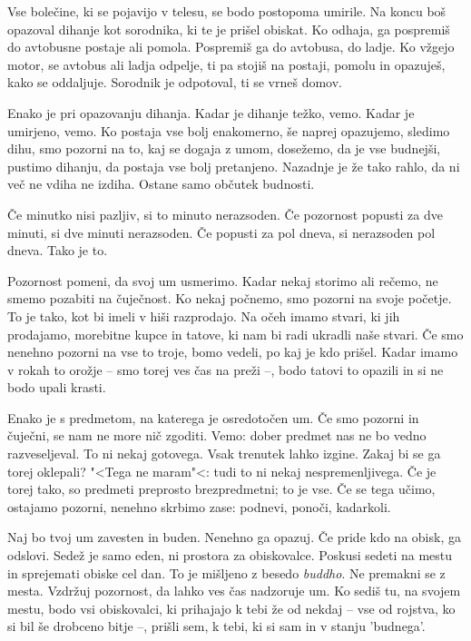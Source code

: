 Vse bolečine, ki se pojavijo v telesu, se bodo postopoma umirile. Na koncu boš opazoval dihanje kot sorodnika, ki te je prišel obiskat. Ko odhaja, ga pospremiš do avtobusne postaje ali pomola. Pospremiš ga do avtobusa, do ladje. Ko vžgejo motor, se avtobus ali ladja odpelje, ti pa stojiš na postaji, pomolu in opazuješ, kako se oddaljuje. Sorodnik je odpotoval, ti se vrneš domov.

Enako je pri opazovanju dihanja. Kadar je dihanje težko, vemo. Kadar je umirjeno, vemo. Ko postaja vse bolj enakomerno, še naprej opazujemo, sledimo dihu, smo pozorni na to, kaj se dogaja z umom, dosežemo, da je vse budnejši, pustimo dihanju, da postaja vse bolj pretanjeno. Nazadnje je že tako rahlo, da ni več ne vdiha ne izdiha. Ostane samo občutek budnosti.

\clearpage


Če minutko nisi pazljiv, si to minuto nerazsoden. Če pozornost popusti za dve minuti, si dve minuti nerazsoden. Če popusti za pol dneva, si nerazsoden pol dneva. Tako je to.

Pozornost pomeni, da svoj um usmerimo. Kadar nekaj storimo ali rečemo, ne smemo pozabiti na čuječnost. Ko nekaj počnemo, smo pozorni na svoje početje. To je tako, kot bi imeli v hiši razprodajo. Na očeh imamo stvari, ki jih prodajamo, morebitne kupce in tatove, ki nam bi radi ukradli naše stvari. Če smo nenehno pozorni na vse to troje, bomo vedeli, po kaj je kdo prišel. Kadar imamo v rokah to orožje – smo torej ves čas na preži –, bodo tatovi to opazili in si ne bodo upali krasti.

Enako je s predmetom, na katerega je osredotočen um. Če smo pozorni in čuječni, se nam ne more nič zgoditi. Vemo: dober predmet nas ne bo vedno razveseljeval. To ni nekaj gotovega. Vsak trenutek lahko izgine. Zakaj bi se ga torej oklepali? "<Tega ne maram"<: tudi to ni nekaj nespremenljivega. Če je torej tako, so predmeti preprosto brezpredmetni; to je vse. Če se tega učimo, ostajamo pozorni, nenehno skrbimo zase: podnevi, ponoči, kadarkoli.

\clearpage


Naj bo tvoj um zavesten in buden. Nenehno ga opazuj. Če pride kdo na obisk, ga odslovi. Sedež je samo eden, ni prostora za obiskovalce. Poskusi sedeti na mestu in sprejemati obiske cel dan. To je mišljeno z besedo \emph{buddho}. Ne premakni se z mesta. Vzdržuj pozornost, da lahko ves čas nadzoruje um. Ko sediš tu, na svojem mestu, bodo vsi obiskovalci, ki prihajajo k tebi že od nekdaj – vse od rojstva, ko si bil še drobceno bitje –, prišli sem, k tebi, ki si sam in v stanju 'budnega'.

